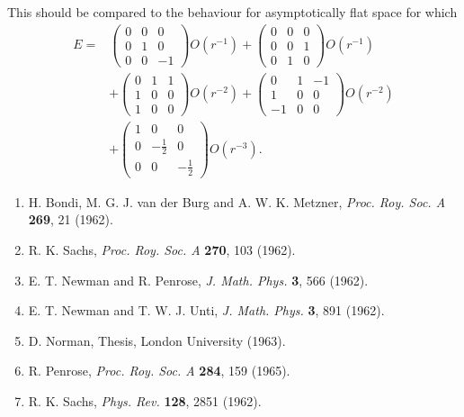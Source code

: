This should be compared to the behaviour for asymptotically
flat space for which
\begin{equation}
\begin{aligned}
E={}&
\begin{pmatrix}
0&0&0\\
0&1&0\\
0&0&-1
\end{pmatrix}O(r^{-1})
+
\begin{pmatrix}
0&0&0\\
0&0&1\\
0&1&0
\end{pmatrix}O(r^{-1})
\\[1ex]
&+
\begin{pmatrix}
0&1&1\\
1&0&0\\
1&0&0
\end{pmatrix}O(r^{-2})
+
\begin{pmatrix}
0&1&-1\\
1&0&0\\
-1&0&0
\end{pmatrix}O(r^{-2})
\\[1ex]
&+
\begin{pmatrix}
1&0&0\\
0&-\frac{1}{2}&0\\
0&0&-\frac{1}{2}
\end{pmatrix}O(r^{-3}).
\end{aligned}
\tag{9.5}
\end{equation}


\begin{enumerate}
\item H. Bondi, M. G. J. van der Burg and A. W. K. Metzner,
  \emph{Proc. Roy. Soc. A} \textbf{269}, 21 (1962).

\item R. K. Sachs,
  \emph{Proc. Roy. Soc. A} \textbf{270}, 103 (1962).

\item E. T. Newman and R. Penrose,
  \emph{J. Math. Phys.} \textbf{3}, 566 (1962).

\item E. T. Newman and T. W. J. Unti,
  \emph{J. Math. Phys.} \textbf{3}, 891 (1962).

\item D. Norman, Thesis, London University (1963).

\item R. Penrose,
  \emph{Proc. Roy. Soc. A} \textbf{284}, 159 (1965).

\item R. K. Sachs,
  \emph{Phys. Rev.} \textbf{128}, 2851 (1962).
\end{enumerate}
